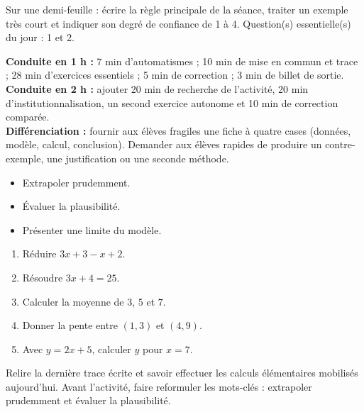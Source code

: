 \begin{sortie}Sur une demi-feuille : écrire la règle principale de la séance, traiter un exemple très court et indiquer son degré de confiance de 1 à 4. Question(s) essentielle(s) du jour : 1 et 2.\end{sortie}

\ifprof
\begin{methode}
\textbf{Conduite en 1 h :} 7 min d'automatismes ; 10 min de mise en commun et trace ; 28 min d'exercices essentiels ; 5 min de correction ; 3 min de billet de sortie.\\
\textbf{Conduite en 2 h :} ajouter 20 min de recherche de l'activité, 20 min d'institutionnalisation, un second exercice autonome et 10 min de correction comparée.\\
\textbf{Différenciation :} fournir aux élèves fragiles une fiche à quatre cases (données, modèle, calcul, conclusion). Demander aux élèves rapides de produire un contre-exemple, une justification ou une seconde méthode.
\end{methode}
\fi
{}
\begin{objectifs}\begin{itemize}\item Extrapoler prudemment.\item Évaluer la plausibilité.\item Présenter une limite du modèle.\end{itemize}\end{objectifs}
\begin{automatismes}\begin{enumerate}\item Réduire $3x+3-x+2$. \item Résoudre $3x+4=25$. \item Calculer la moyenne de $3$, $5$ et $7$. \item Donner la pente entre $(1,3)$ et $(4,9)$. \item Avec $y=2x+5$, calculer $y$ pour $x=7$. \end{enumerate}\end{automatismes}
\begin{prerequis}Relire la dernière trace écrite et savoir effectuer les calculs élémentaires mobilisés aujourd'hui. Avant l'activité, faire reformuler les mots-clés : extrapoler prudemment et évaluer la plausibilité.\end{prerequis}


